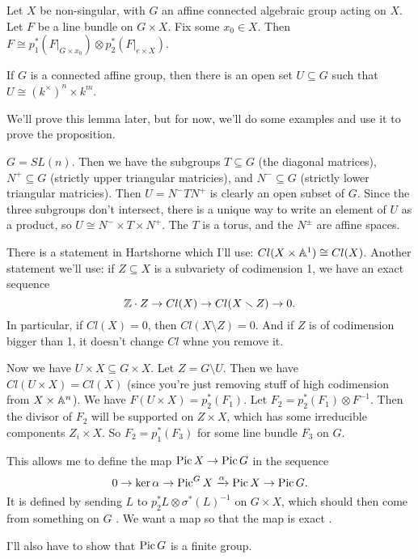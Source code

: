 \begin{proposition}
 Let $X$ be non-singular, with $G$ an affine connected algebraic group acting on $X$. Let $F$ be a line bundle on $G\times X$. Fix some $x_0\in X$. Then $F\cong p_1^*(F|_{G\times x_0}) \otimes p_2^*(F|_{e\times X})$.
\end{proposition}
\begin{lemma}
 If $G$ is a connected affine group, then there is an open set $U\subseteq G$ such that $U\cong (k^\times)^n\times k^m$.
\end{lemma}
We'll prove this lemma later, but for now, we'll do some examples and use it to prove the proposition.
\begin{example}
 $G=SL(n)$. Then we have the subgroups $T\subseteq G$ (the diagonal matrices), $N^+\subseteq G$ (strictly upper triangular matricies), and $N^-\subseteq G$ (strictly lower triangular matricies). Then $U=N^-TN^+$ is clearly an open subset of $G$. Since the three subgroups don't intersect, there is a unique way to write an element of $U$ as a product, so $U\cong N^-\times T\times N^+$. The $T$ is a torus, and the $N^\pm$ are affine spaces.
\end{example}
There is a statement in Hartshorne which I'll use: $Cl(X\times \AA^1)\cong Cl(X)$. Another statement we'll use: if $Z\subseteq X$ is a subvariety of codimension 1, we have an exact sequence
\[
 \ZZ\cdot Z \to Cl(X)\to Cl(X\setminus Z)\to 0.
\]
In particular, if $Cl(X)=0$, then $Cl(X\setminus Z)=0$. And if $Z$ is of codimension bigger than 1, it doesn't change $Cl$ whne you remove it.

Now we have $U\times X\subseteq G\times X$. Let $Z=G\setminus U$. Then we have $Cl(U\times X)=Cl(X)$ (since you're just removing stuff of high codimension from $X\times \AA^n$). We have $F(U\times X)=p_2^*(F_1)$. Let $F_2=p_2^*(F_1)\otimes F^{-1}$. Then the divisor of $F_2$ will be supported on $Z\times X$, which has some irreducible components $Z_i\times X$. So $F_2=p_1^*(F_3)$ for some line bundle $F_3$ on $G$.

This allows me to define the map $\pic X\to \pic G$ in the sequence
\[
 0\to \ker \alpha\to \pic^G X\xrightarrow\alpha \pic X\to \pic G.
\]
It is defined by sending $L$ to $p_2^*L\otimes \sigma^*(L)^{-1}$ on $G\times X$, which should then come from something on $G$ . We want a map so that the map is exact .

I'll also have to show that $\pic G$ is a finite group.